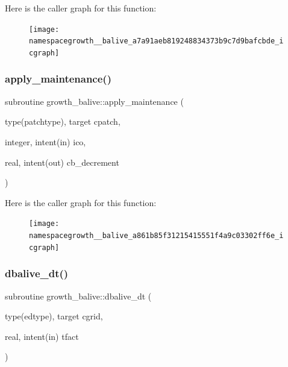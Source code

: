 Here is the caller graph for this function\+:
\nopagebreak
\begin{figure}[H]
\begin{center}
\leavevmode
\texttt{[image: namespacegrowth\_\_balive\_a7a91aeb819248834373b9c7d9bafcbde\_icgraph]}
\end{center}
\end{figure}
\mbox{\label{namespacegrowth__balive_a861b85f31215415551f4a9c03302ff6e}} 
\subsubsection{\texorpdfstring{apply\+\_\+maintenance()}{apply\_maintenance()}}
{\footnotesize\ttfamily subroutine growth\+\_\+balive\+::apply\+\_\+maintenance (\begin{DoxyParamCaption}\item[{type(patchtype), target}]{cpatch,  }\item[{integer, intent(in)}]{ico,  }\item[{real, intent(out)}]{cb\+\_\+decrement }\end{DoxyParamCaption})}

Here is the caller graph for this function\+:
\nopagebreak
\begin{figure}[H]
\begin{center}
\leavevmode
\texttt{[image: namespacegrowth\_\_balive\_a861b85f31215415551f4a9c03302ff6e\_icgraph]}
\end{center}
\end{figure}
\mbox{\label{namespacegrowth__balive_a7781ae229b2399c90d50858382665ee8}} 
\subsubsection{\texorpdfstring{dbalive\+\_\+dt()}{dbalive\_dt()}}
{\footnotesize\ttfamily subroutine growth\+\_\+balive\+::dbalive\+\_\+dt (\begin{DoxyParamCaption}\item[{type(edtype), target}]{cgrid,  }\item[{real, intent(in)}]{tfact }\end{DoxyParamCaption})}



